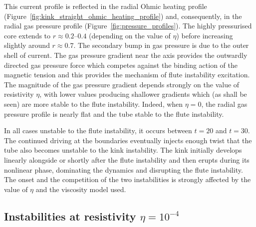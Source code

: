 \documentclass[fleqn,usenatbib]{mnras}
\newcommand{\rev}[1]{{\color{red} {#1}}}
\begin{document}
This current profile is reflected in the radial Ohmic heating profile
(Figure~\ref{fig:kink_straight_ohmic_heating_profile}) and, consequently, in
the radial \rev{gas} pressure profile (Figure~\ref{fig:pressure_profiles}). The highly
pressurised core extends to $r\approx 0.2$--$0.4$ (depending on the value of
$\eta$) before increasing slightly around $r\approx 0.7$. The secondary bump in
\rev{gas} pressure is due to the outer shell of current. The \rev{gas}
pressure gradient near the
axis provides the outwardly directed \rev{gas} pressure force which competes against the
binding action of the magnetic tension and this provides the mechanism of flute
instability excitation.  The magnitude of the \rev{gas} pressure gradient depends
strongly on the value of resistivity $\eta$, with lower values producing
shallower gradients which (as shall be seen) are more stable to the flute
instability. Indeed, when $\eta=0$, the radial \rev{gas} pressure profile is nearly flat
and the tube stable to the flute instability.

In all cases unstable to the flute instability, it occurs between $t=20$ and
$t=30$. The continued driving at the boundaries eventually injects enough twist
that the tube also becomes unstable to the kink instability. The kink initially
develops linearly alongside or shortly after the flute instability and then
\rev{erupts during its nonlinear phase}, dominating the dynamics and disrupting
the   flute instability. The onset and the competition of the two instabilities
is strongly affected by the value of $\eta$ and the viscosity model used. 

\subsection{Instabilities at resistivity $\eta=10^{-4}$}
\end{document}
